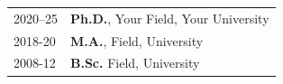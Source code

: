 

\renewcommand{\thefootnote}{\fnsymbol{footnote}}
\setcounter{footnote}{0}

\begin{longtable}[l]{@{}p{} p{}@{}}
    2020--25\footnotemark & \textbf{Ph.D.}, Your Field, Your University \\

    2018-20 & \textbf{M.A.}, Field, University \\

    2008-12 & \textbf{B.Sc.} Field, University
\end{longtable}



\renewcommand{\thefootnote}{\arabic{footnote}}
\setcounter{footnote}{1}
